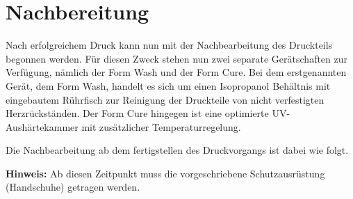 \documentclass{\basedir/fablab-document}
\begin{document}
\pagebreak


\section{Nachbereitung}

Nach erfolgreichem Druck kann nun mit der Nachbearbeitung des Druckteils begonnen werden. Für diesen Zweck stehen nun zwei separate Gerätschaften zur Verfügung, nämlich der Form Wash und der Form Cure. 
Bei dem erstgenannten Gerät, dem Form Wash, handelt es sich um einen Isopropanol Behältnis mit eingebautem Rührfisch zur Reinigung der Druckteile von nicht verfestigten Herzrückständen. Der Form Cure hingegen ist eine optimierte UV-Aushärtekammer mit zusätzlicher Temperaturregelung. 

Die Nachbearbeitung ab dem fertigstellen des Druckvorgangs ist dabei wie folgt. 

\textbf{Hinweis:} Ab diesen Zeitpunkt muss die vorgeschriebene Schutzausrüstung (Handschuhe) getragen werden.
\end{document}

